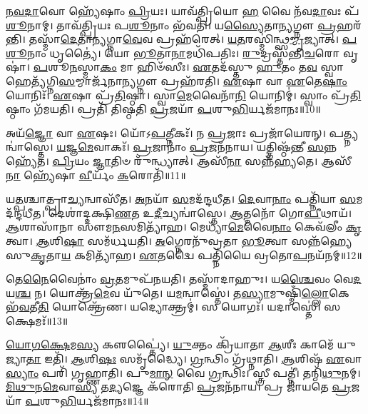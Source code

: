 \-\ul{𑌨}\-\-\ul{𑌵}\-\-\ul{𑌦𑌾}\-𑌵𑍋 𑌹𑍍𑌯𑍇᳴𑌷𑌾𑌂 \ul{𑌪𑍍𑌰𑌿}\-𑌯𑌃।
𑌯𑌾𑌵᳴𑌤𑍍𑌪𑍍𑌰𑌿𑌯𑍋 \ul{𑌹} 𑌵𑍈 𑌨᳴𑌵\-\ul{𑌦𑌾}\-𑌵𑌃 𑌪᳴\-\ul{𑌶𑍂}\-𑌨𑌾𑌮𑍍।
𑌤𑌾𑌵᳴𑌤𑍍𑌪𑍍𑌰𑌿𑌯𑌃 𑌪\-\ul{𑌶𑍂}\-𑌨𑌾𑌂 𑌭᳴𑌵𑌤𑌿।
𑌯\-\ul{𑌸𑍍𑌯𑍈}\-𑌤𑌾\-\ul{𑌨𑍍𑌯}\-𑌗𑍍𑌨𑍗 \ul{𑌪𑍍𑌰}\-𑌹𑌰᳴𑌨𑍍𑌤𑌿।
𑌤𑌸𑍍𑌮𑌾᳴\-\ul{𑌦𑍇}\-𑌤𑌾\-\ul{𑌨𑍍𑌯}\-𑌗𑍍𑌨𑌾\-\ul{𑌵𑍇}\-𑌵 𑌪𑍍𑌰𑌹᳴𑌰𑍇𑌤𑍍।
\-\ul{𑌯}\-\-\ul{𑌤}\-𑌰𑌸𑍍𑌮𑌿॑𑌨𑍍𑌥𑍍𑌸\-\ul{𑌮𑍍𑌮𑍃}\-𑌜𑍍𑌯𑌾𑌤𑍍।
\-\ul{𑌪}\-\-\ul{𑌶𑍂}\-𑌨𑌾𑌂 𑌧𑍃𑌤𑍍𑌯𑍈॑।
𑌯𑍋 \ul{𑌭𑍂}\-𑌤𑌾\-\ul{𑌨𑌾}\-𑌮𑌧𑌿᳴𑌪𑌤𑌿𑌃।
\-\ul{𑌰𑍁}\-𑌦𑍍𑌰𑌸𑍍𑌤᳴𑌨𑍍𑌤𑌿\-\ul{𑌚}\-𑌰𑍋 𑌵𑍃𑌷𑌾॑।
\-\ul{𑌪}\-𑌶𑍂\-\ul{𑌨}\-𑌸𑍍𑌮𑌾\-\ul{𑌕𑌂} 𑌮𑌾 𑌹𑌿𑍞᳴𑌸𑍀𑌃।
\-\ul{𑌏}\-𑌤𑌦᳴𑌸𑍍𑌤𑍁 \ul{𑌹𑍁}\-𑌤𑌂 𑌤\-\ul{𑌵} 𑌸𑍍𑌵𑌾𑌹𑍇𑌤𑍍𑌯᳴𑌗𑍍𑌨𑌿\-\ul{𑌸}\-𑌮𑍍𑌮𑌾𑌰𑍍𑌜᳴𑌨𑌾\-\ul{𑌨𑍍𑌯}\-𑌗𑍍𑌨𑍗 𑌪𑍍𑌰𑌹᳴𑌰𑌤𑌿।
\-\ul{𑌏}\-𑌷𑌾 𑌵𑌾 \ul{𑌏}\-𑌤𑍇\-\ul{𑌷𑌾𑌂} 𑌯𑍋𑌨𑌿𑌃᳴।
\-\ul{𑌏}\-𑌷𑌾 𑌪𑍍𑌰᳴\-\ul{𑌤𑌿}\-𑌷𑍍𑌠𑌾।
𑌸𑍍𑌵𑌾\-\ul{𑌮𑍇}\-𑌵𑍈𑌨𑌾᳴\-\ul{𑌨𑌿} 𑌯𑍋𑌨𑌿𑌮𑍍॑।
𑌸𑍍𑌵𑌾𑌂 𑌪𑍍𑌰᳴\-\ul{𑌤𑌿}\-𑌷𑍍𑌠𑌾𑌂 𑌗᳴𑌮𑌯𑌤𑌿।
𑌪𑍍𑌰𑌤𑌿᳴ 𑌤𑌿𑌷𑍍𑌠𑌤𑌿 \ul{𑌪𑍍𑌰}\-𑌜𑌯𑌾᳴ \ul{𑌪}\-𑌶𑍁\-\ul{𑌭𑌿}\-𑌰𑍍𑌯𑌜᳴𑌮𑌾𑌨𑌃॥10॥

𑌅𑌯᳴\-\ul{𑌜𑍍𑌞𑍋} 𑌵𑌾 \ul{𑌏}\-𑌷𑌃।
𑌯𑍋᳴𑌽\-\ul{𑌪}\-𑌤𑍍𑌨𑍀𑌕𑌃᳴।
𑌨 \ul{𑌪𑍍𑌰}\-𑌜𑌾𑌃 𑌪𑍍𑌰𑌜𑌾᳴𑌯𑍇𑌰𑌨𑍍।
𑌪𑌤𑍍𑌨𑍍𑌯𑌨𑍍𑌵𑌾॑𑌸𑍍𑌤𑍇।
\-\ul{𑌯}\-𑌜𑍍𑌞\-\ul{𑌮𑍇}\-𑌵𑌾𑌕𑌃᳴।
\-\ul{𑌪𑍍𑌰}\-𑌜𑌾𑌨𑌾𑌂॑ \ul{𑌪𑍍𑌰}\-𑌜𑌨᳴𑌨𑌾𑌯।
𑌯𑌤𑍍𑌤𑌿𑌷𑍍𑌠᳴𑌨𑍍𑌤𑍀 \ul{𑌸}\-𑌨𑍍𑌨𑌹𑍍𑌯𑍇᳴𑌤।
\-\ul{𑌪𑍍𑌰𑌿}\-𑌯𑌂 \ul{𑌜𑍍𑌞𑌾}\-𑌤𑌿𑍞 𑌰𑍁᳴𑌨𑍍𑌧𑍍𑌯𑌾𑌤𑍍।
𑌆𑌸𑍀᳴\-\ul{𑌨𑌾} 𑌸𑌨𑍍𑌨᳴𑌹𑍍𑌯𑌤𑍇।
𑌆𑌸𑍀᳴\-\ul{𑌨𑌾} 𑌹𑍍𑌯𑍇᳴𑌷𑌾 \ul{𑌵𑍀}\-𑌰𑍍𑌯𑌂᳴ \ul{𑌕}\-𑌰𑍋𑌤𑌿᳴॥11॥

𑌯\-\ul{𑌤𑍍𑌪}\-𑌶𑍍𑌚𑌾𑌤𑍍𑌪𑍍𑌰𑌾\-\ul{𑌚𑍍𑌯}\-𑌨𑍍𑌵𑌾𑌸𑍀᳴𑌤।
\-\ul{𑌅}\-𑌨𑌯𑌾᳴ \ul{𑌸}\-𑌮𑌦᳴𑌨𑍍𑌦𑌧𑍀𑌤।
\-\ul{𑌦𑍇}\-𑌵𑌾\-\ul{𑌨𑌾𑌂} 𑌪𑌤𑍍𑌨𑌿᳴𑌯𑌾 \ul{𑌸}\-𑌮𑌦᳴𑌨𑍍𑌦𑌧𑍀𑌤।
𑌦𑍇𑌶𑌾॑𑌦𑍍𑌦𑌕𑍍𑌷𑌿\-\ul{𑌣}\-𑌤 𑌉\-\ul{𑌦𑍀}\-𑌚𑍍𑌯𑌨𑍍𑌵𑌾॑𑌸𑍍𑌤𑍇।
\-\ul{𑌆}\-𑌤𑍍𑌮𑌨𑍋᳴ 𑌗𑍋\-\ul{𑌪𑍀}\-𑌥𑌾𑌯᳴।
\-\ul{𑌆}\-𑌶𑌾𑌸𑌾᳴𑌨𑌾 𑌸𑍗𑌮\-\ul{𑌨}\-𑌸𑌮𑌿𑌤𑍍𑌯𑌾᳴𑌹।
𑌮𑍇𑌧𑍍𑌯𑌾᳴\-\ul{𑌮𑍇}\-𑌵𑍈\-\ul{𑌨𑌾𑌂} 𑌕𑍇𑌵᳴𑌲𑍀𑌂 \ul{𑌕𑍃}\-𑌤𑍍𑌵𑌾।
\-\ul{𑌆}\-𑌶𑌿\-\ul{𑌷𑌾} 𑌸𑌮᳴𑌰𑍍𑌧𑌯𑌤𑌿।
\-\ul{𑌅}\-𑌗𑍍𑌨𑍇𑌰𑌨𑍁᳴\-𑌵𑍍𑌰𑌤𑌾 \ul{𑌭𑍂}\-𑌤𑍍𑌵𑌾 𑌸𑌨𑍍𑌨᳴𑌹𑍍𑌯𑍇 𑌸𑍁\-\ul{𑌕𑍃}\-𑌤𑌾\-\ul{𑌯} 𑌕𑌮𑌿𑌤𑍍𑌯𑌾᳴𑌹।
\-\ul{𑌏}\-𑌤𑌦𑍍𑌵𑍈 𑌪𑌤𑍍𑌨𑌿᳴𑌯𑍈 𑌵𑍍𑌰𑌤𑍋\-\ul{𑌪}\-𑌨𑌯᳴𑌨𑌮𑍍॥12॥

𑌤𑍇\-\ul{𑌨𑍈}\-𑌵𑍈𑌨𑌾𑌂॑ \ul{𑌵𑍍𑌰}\-𑌤𑌮𑍁𑌪᳴𑌨𑌯𑌤𑌿।
𑌤𑌸𑍍𑌮𑌾᳴𑌦𑌾𑌹𑍁𑌃।
𑌯\-\ul{𑌶𑍍𑌚𑍈}\-𑌵𑌂 𑌵𑍇\-\ul{𑌦} 𑌯\-\ul{𑌶𑍍𑌚} 𑌨।
𑌯𑍋𑌕𑍍𑌤𑍍𑌰᳴\-\ul{𑌮𑍇}\-𑌵 𑌯𑍁᳴𑌤𑍇।
𑌯\-\ul{𑌮}\-𑌨𑍍𑌵𑌾𑌸𑍍𑌤𑍇॑।
𑌤\-\ul{𑌸𑍍𑌯𑌾}\-𑌮𑍁𑌷𑍍𑌮𑌿𑌁᳴\-\ul{𑌲𑍍𑌲𑍋}\-𑌕𑍇 𑌭᳴\-\ul{𑌵}\-𑌤𑍀\-\ul{𑌤𑌿} 𑌯𑍋𑌕𑍍𑌤𑍍𑌰𑍇᳴𑌣।
𑌯𑌦𑍍𑌯𑍋𑌕𑍍𑌤𑍍𑌰𑌮𑍍॑।
𑌸 𑌯𑍋𑌗𑌃᳴।
𑌯𑌦𑌾𑌸𑍍𑌤𑍇॑।
𑌸 𑌕𑍍𑌷𑍇𑌮𑌃᳴॥13॥

\-\ul{𑌯𑍋}\-\-\ul{𑌗}\-\-\ul{𑌕𑍍𑌷𑍇}\-𑌮\-\ul{𑌸𑍍𑌯} 𑌕𑍢𑌪𑍍𑌤𑍍𑌯𑍈॑।
\-\ul{𑌯𑍁}\-𑌕𑍍𑌤𑌂 𑌕𑍍𑌰𑌿᳴𑌯𑌾𑌤𑌾 \ul{𑌆}\-𑌶𑍀𑌃 𑌕𑌾𑌮𑍇᳴ 𑌯𑍁𑌜𑍍𑌯𑌾\-\ul{𑌤𑌾} 𑌇𑌤𑌿᳴।
\-\ul{𑌆}\-𑌶𑌿\-\ul{𑌷𑌃} 𑌸𑌮𑍃᳴𑌦𑍍𑌧𑍍𑌯𑍈।
\-\ul{𑌗𑍍𑌰}\-𑌨𑍍𑌥𑌿𑌂 𑌗𑍍𑌰᳴𑌥𑍍𑌨𑌾𑌤𑌿।
\-\ul{𑌆}\-𑌶𑌿𑌷᳴ \ul{𑌏}\-𑌵𑌾\-\ul{𑌸𑍍𑌯𑌾𑌂} 𑌪𑌰𑌿᳴ 𑌗𑍃𑌹𑍍𑌣𑌾𑌤𑌿।
𑌪𑍁\-\ul{𑌮𑌾}\-\-\ul{𑌨𑍍} 𑌵𑍈 \ul{𑌗𑍍𑌰}\-𑌨𑍍𑌥𑌿𑌃।
𑌸𑍍𑌤𑍍𑌰𑍀 𑌪𑌤𑍍𑌨𑍀॑।
𑌤𑌨𑍍𑌮𑌿᳴\-\ul{𑌥𑍁}\-𑌨𑌮𑍍।
\-\ul{𑌮𑌿}\-\-\ul{𑌥𑍁}\-𑌨\-\ul{𑌮𑍇}\-𑌵𑌾\-\ul{𑌸𑍍𑌯} 𑌤\-\ul{𑌦𑍍𑌯}\-𑌜𑍍𑌞𑍇 𑌕᳴𑌰𑍋𑌤𑌿 \ul{𑌪𑍍𑌰}\-𑌜𑌨᳴𑌨𑌾𑌯।
𑌪𑍍𑌰 𑌜𑌾᳴𑌯𑌤𑍇 \ul{𑌪𑍍𑌰}\-𑌜𑌯𑌾᳴ \ul{𑌪}\-𑌶𑍁\-\ul{𑌭𑌿}\-𑌰𑍍𑌯𑌜᳴𑌮𑌾𑌨𑌃॥14॥


